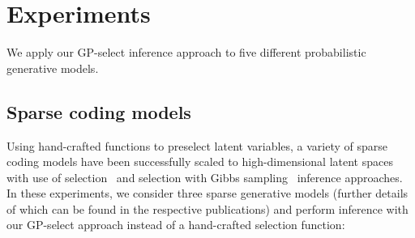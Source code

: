 \section{Experiments}
\label{exps}
%
We apply our GP-select inference approach to five different probabilistic generative models.

\subsection{Sparse coding models}
\label{sec:sparse-coding}
Using hand-crafted functions to preselect latent variables, a variety of sparse coding models have been successfully scaled to high-dimensional  latent spaces with use of  selection~\citep{HennigesEtAl2010, BornscheinEtAl2013, SheikhEtAl2014} and selection with Gibbs sampling~\citep{SheltonEtAl2011, SheltonEtAl2012} inference approaches.
In these experiments, we consider three sparse generative models (further details of which can be found in the respective publications) and perform inference with our GP-select approach instead of a hand-crafted selection function:
%

